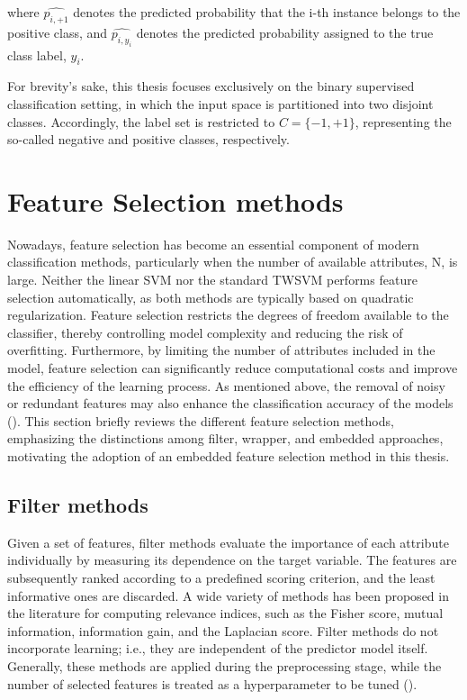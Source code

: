 \documentclass[12pt]{report} %
\begin{document}
where $\hat{p_{i,+1}}$ denotes the predicted probability that the i-th instance belongs to the positive class, and $\hat{p_{i,y_i}}$ denotes the predicted probability assigned to the true class label, $y_i$. 

For brevity's sake, this thesis focuses exclusively on the binary supervised classification setting, in which the input space is partitioned into two disjoint classes. Accordingly, the label set is restricted to $C = \{-1, +1\}$, representing the so-called negative and positive classes, respectively.



\chapter{Feature Selection methods} \label{chap:feature-selection}

Nowadays, feature selection has become an essential component of modern classification methods, particularly when the number of available attributes, N, is large. Neither the linear SVM nor the standard TWSVM performs feature selection automatically, as both methods are typically based on quadratic regularization. Feature selection restricts the degrees of freedom available to the classifier, thereby controlling model complexity and reducing the risk of overfitting. Furthermore, by limiting the number of attributes included in the model, feature selection can significantly reduce computational costs and improve the efficiency of the learning process. As mentioned above, the removal of noisy or redundant features may also enhance the classification accuracy of the models (\cite{hastie2009elements}). This section briefly reviews the different feature selection methods, emphasizing the distinctions among filter, wrapper, and embedded approaches, motivating the adoption of an embedded feature selection method in this thesis.


\section{Filter methods} \label{sec:filter-methods}

Given a set of features, filter methods evaluate the importance of each attribute individually by measuring its dependence on the target variable. The features are subsequently ranked according to a predefined scoring criterion, and the least informative ones are discarded. A wide variety of methods has been proposed in the literature for computing relevance indices, such as the Fisher score, mutual information, information gain, and the Laplacian score. Filter methods do not incorporate learning; i.e., they are independent of the predictor model itself. Generally, these methods are applied during the preprocessing stage, while the number of selected features is treated as a hyperparameter to be tuned (\cite{zaki2014data}).
\end{document}
